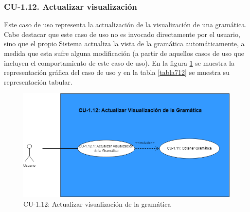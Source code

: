  \subsubsection{CU-1.12. Actualizar visualización}

 Este caso de uso representa la actualización de la visualización de una gramática. Cabe destacar que este caso de uso no es invocado directamente por el usuario, sino que el propio Sistema actualiza la vista de la gramática automáticamente, a medida que esta sufre alguna modificación (a partir de aquellos casos de uso que incluyen el comportamiento de este caso de uso). En la figura \ref{fig:CU112} se muestra la representación gráfica del caso de uso y en la  tabla \ref{tabla712} se muestra su representación tabular.

  \begin{figure}[H]
       \begin{center} 
 	\includegraphics[scale=0.55]{figuras/Cap7/CU112.png}
 	\caption{CU-1.12: Actualizar visualización de la gramática}
 	\label{fig:CU112}
       \end{center}
   \end{figure}

